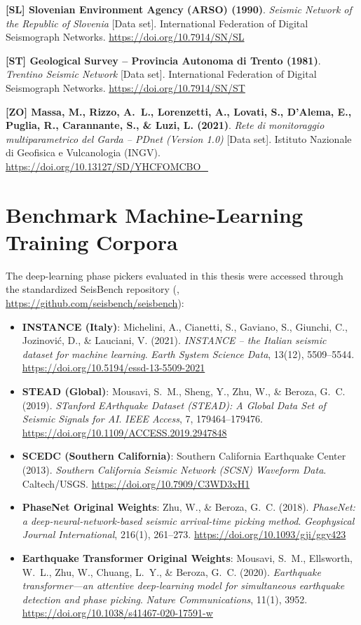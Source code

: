\begin{enumerate}[label={[\textbf{\arabic*}]},leftmargin=*]
  \item \textbf{[SL] Slovenian Environment Agency (ARSO) (1990)}. 
  \textit{Seismic Network of the Republic of Slovenia} [Data set]. 
  International Federation of Digital Seismograph Networks. 
  \url{https://doi.org/10.7914/SN/SL}

  \item \textbf{[ST] Geological Survey -- Provincia Autonoma di Trento (1981)}. 
  \textit{Trentino Seismic Network} [Data set]. 
  International Federation of Digital Seismograph Networks. 
  \url{https://doi.org/10.7914/SN/ST}

  \item \textbf{[ZO] Massa, M., Rizzo, A.~L., Lorenzetti, A., Lovati, S., D'Alema, E., Puglia, R., Carannante, S., \& Luzi, L. (2021)}. 
  \textit{Rete di monitoraggio multiparametrico del Garda -- PDnet (Version 1.0)} [Data set]. 
  Istituto Nazionale di Geofisica e Vulcanologia (INGV). 
  \url{https://doi.org/10.13127/SD/YHCFOMCBO_}
\end{enumerate}

\section*{Benchmark Machine-Learning Training Corpora}

The deep-learning phase pickers evaluated in this thesis were accessed through the standardized SeisBench repository (\cite{SeisBench}, \url{https://github.com/seisbench/seisbench}):
\begin{itemize}
  \item \textbf{INSTANCE (Italy)}: Michelini, A., Cianetti, S., Gaviano, S., Giunchi, C., Jozinovi\'c, D., \& Lauciani, V. (2021). \textit{INSTANCE -- the Italian seismic dataset for machine learning}. \textit{Earth System Science Data}, 13(12), 5509--5544. \url{https://doi.org/10.5194/essd-13-5509-2021}
  \item \textbf{STEAD (Global)}: Mousavi, S.~M., Sheng, Y., Zhu, W., \& Beroza, G.~C. (2019). \textit{STanford EArthquake Dataset (STEAD): A Global Data Set of Seismic Signals for AI}. \textit{IEEE Access}, 7, 179464--179476. \url{https://doi.org/10.1109/ACCESS.2019.2947848}
  \item \textbf{SCEDC (Southern California)}: Southern California Earthquake Center (2013). \textit{Southern California Seismic Network (SCSN) Waveform Data}. Caltech/USGS. \url{https://doi.org/10.7909/C3WD3xH1}
  \item \textbf{PhaseNet Original Weights}: Zhu, W., \& Beroza, G.~C. (2018). \textit{PhaseNet: a deep-neural-network-based seismic arrival-time picking method}. \textit{Geophysical Journal International}, 216(1), 261--273. \url{https://doi.org/10.1093/gji/ggy423}
  \item \textbf{Earthquake Transformer Original Weights}: Mousavi, S.~M., Ellsworth, W.~L., Zhu, W., Chuang, L.~Y., \& Beroza, G.~C. (2020). \textit{Earthquake transformer---an attentive deep-learning model for simultaneous earthquake detection and phase picking}. \textit{Nature Communications}, 11(1), 3952. \url{https://doi.org/10.1038/s41467-020-17591-w}
\end{itemize}

